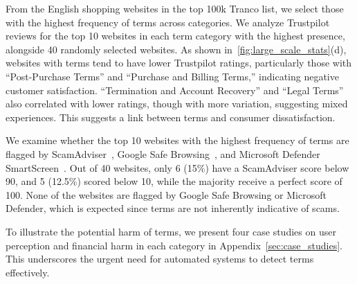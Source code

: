 From the English shopping websites in the top 100k Tranco list, we select those with the highest frequency of \termname terms across categories. We analyze Trustpilot~\citep{trustpilot} reviews for the top 10 websites in each \termname term category with the highest presence, alongside 40 randomly selected websites. 
As shown in~\autoref{fig:large_scale_stats}(d), websites with \termname terms tend to have lower Trustpilot ratings, particularly those with ``Post-Purchase Terms'' and ``Purchase and Billing Terms,'' indicating negative customer satisfaction. ``Termination and Account Recovery'' and ``Legal Terms'' also correlated with lower ratings, though with more variation, suggesting mixed experiences. This suggests a link between \termname terms and consumer dissatisfaction.




We examine whether the top 10 websites with the highest frequency of \termname terms are flagged by ScamAdviser~\citep{scamadviser2024website}, Google Safe Browsing~\citep{google2024safebrowsing}, and Microsoft Defender SmartScreen~\citep{microsoft2024smartscreen}. Out of 40 websites, only 6 (15\%) have a ScamAdviser score below 90, and 5 (12.5\%) scored below 10, while the majority receive a perfect score of 100. None of the websites are flagged by Google Safe Browsing or Microsoft Defender, which is expected since \termname terms are not inherently indicative of scams. %


 To illustrate the potential harm of \termname terms,  we present four case studies on user perception and financial harm in each category in Appendix~\ref{sec:case_studies}. This underscores the urgent need for automated systems to detect \termname terms effectively.
